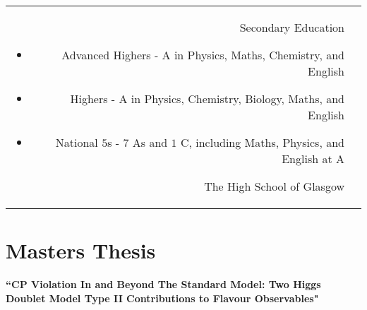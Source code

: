 \documentclass[10pt]{article} %
\begin{document}
\begin{paracol}{2}
\begin{supertabular}{rp{6.7cm}}

	{Secondary Education} %
	{} %
    {\vspace{-5pt}
     \begin{itemize}[noitemsep]
        \item Advanced Highers - A in Physics, Maths, Chemistry, and English
        \item Highers - A in Physics, Chemistry, Biology, Maths, and English
        \item National $5$s - $7$ As and $1$ C, including Maths, Physics, and English at A
     \end{itemize}\vspace{-10pt}} %
     {The High School of Glasgow} %


\end{supertabular}



\section{Masters Thesis}

{\raggedright\textbf{``CP Violation In and Beyond The Standard Model: Two Higgs Doublet Model Type II Contributions to Flavour Observables"}\\\medskip}


\end{paracol}
\end{document}
